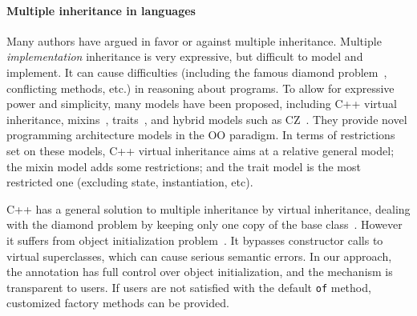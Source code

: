 \paragraph{Multiple inheritance in \objectoriented languages}
Many authors have argued in favor or against multiple inheritance.
Multiple \emph{implementation}
inheritance is very expressive, but difficult to model and implement. It can
cause difficulties (including the famous diamond
problem~\cite{bracha90mixin,Sak89dis}, conflicting methods, etc.) in reasoning about
programs. To allow for expressive power and simplicity, many
models have been proposed, including C++ virtual inheritance,
mixins~\cite{bracha90mixin}, traits~\cite{scharli03traits}, and hybrid models
such as CZ~\cite{malayeri2009cz}.  They provide novel programming architecture
models in the OO paradigm. In terms of restrictions set on these models, C++
virtual inheritance aims at a relative general model; the mixin model adds some
restrictions; and the trait model is the most restricted one (excluding
state, instantiation, etc).

C++ has a general solution to multiple inheritance by
virtual inheritance, dealing with the diamond problem by keeping only
one copy of the base class~\cite{ellis1990annotated}. However it 
suffers from object initialization problem~\cite{malayeri2009cz}.
It bypasses constructor calls to virtual superclasses, which can
cause serious semantic errors. In our approach, the \mixin
annotation has full control over object initialization,
and the mechanism is transparent to users. If users are not satisfied with the default
 \texttt{of} method, customized factory methods can be provided.

